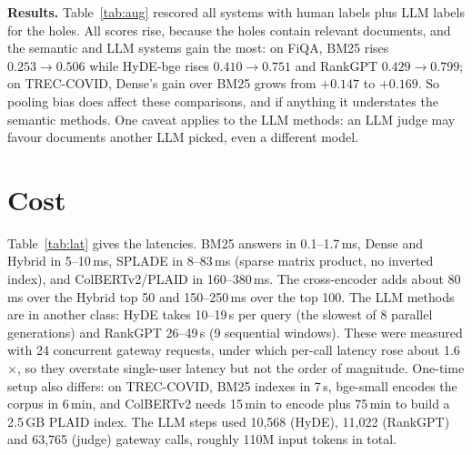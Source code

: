 \documentclass[11pt]{article}
\begin{document}
\textbf{Results.} Table~\ref{tab:aug} rescored all systems with human labels plus LLM labels for
the holes. All scores rise, because the holes contain relevant documents, and the semantic and LLM
systems gain the most: on FiQA, BM25 rises $0.253\to0.506$ while HyDE-bge rises $0.410\to0.751$ and
RankGPT $0.429\to0.799$; on TREC-COVID, Dense's gain over BM25 grows from $+0.147$ to $+0.169$. So
pooling bias does affect these comparisons, and if anything it understates the semantic methods.
One caveat applies to the LLM methods: an LLM judge may favour documents another LLM picked, even a
different model.

\section{Cost}
Table~\ref{tab:lat} gives the latencies. BM25 answers in 0.1--1.7\,ms, Dense and Hybrid in 5--10\,ms,
SPLADE in 8--83\,ms (sparse matrix product, no inverted index), and ColBERTv2/PLAID in 160--380\,ms. The
cross-encoder adds about 80\,ms over the Hybrid top 50 and 150--250\,ms over the top 100. The LLM
methods are in another class: HyDE takes 10--19\,s per query (the slowest of 8 parallel generations)
and RankGPT 26--49\,s (9 sequential windows). These were measured with 24 concurrent gateway requests,
under which per-call latency rose about 1.6$\times$, so they overstate single-user latency but not
the order of magnitude. One-time setup also differs: on TREC-COVID, BM25 indexes in 7\,s,
bge-small encodes the corpus in 6\,min, and ColBERTv2 needs 15\,min to encode plus 75\,min to build a
2.5\,GB PLAID index. The LLM steps used 10,568 (HyDE), 11,022 (RankGPT) and 63,765 (judge) gateway
calls, roughly 110M input tokens in total.
\end{document}
